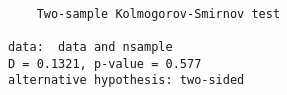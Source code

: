 \begin{verbatim} 

	Two-sample Kolmogorov-Smirnov test

data:  data and nsample
D = 0.1321, p-value = 0.577
alternative hypothesis: two-sided

\end{verbatim}